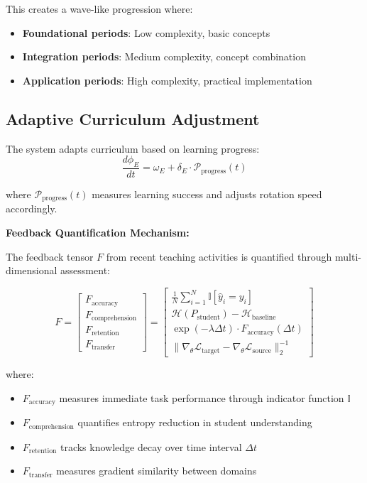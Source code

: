This creates a wave-like progression where:
\begin{itemize}
    \item \textbf{Foundational periods}: Low complexity, basic concepts
    \item \textbf{Integration periods}: Medium complexity, concept combination
    \item \textbf{Application periods}: High complexity, practical implementation
\end{itemize}

\subsection{Adaptive Curriculum Adjustment}

The system adapts curriculum based on learning progress:
\begin{equation}
\frac{d\phi_E}{dt} = \omega_E + \delta_E \cdot \mathcal{P}_{\text{progress}}(t)
\end{equation}

where $\mathcal{P}_{\text{progress}}(t)$ measures learning success and adjusts rotation speed accordingly.

\textbf{Feedback Quantification Mechanism:}

The feedback tensor $F$ from recent teaching activities is quantified through multi-dimensional assessment:

\begin{equation}
F = \begin{bmatrix}
F_{\text{accuracy}} \\
F_{\text{comprehension}} \\
F_{\text{retention}} \\
F_{\text{transfer}}
\end{bmatrix} = \begin{bmatrix}
\frac{1}{N} \sum_{i=1}^N \mathbb{I}[\hat{y}_i = y_i] \\
\mathcal{H}(P_{\text{student}}) - \mathcal{H}_{\text{baseline}} \\
\exp(-\lambda \Delta t) \cdot F_{\text{accuracy}}(\Delta t) \\
\|\nabla_{\theta} \mathcal{L}_{\text{target}} - \nabla_{\theta} \mathcal{L}_{\text{source}}\|_2^{-1}
\end{bmatrix}
\end{equation}

where:
\begin{itemize}
    \item $F_{\text{accuracy}}$ measures immediate task performance through indicator function $\mathbb{I}$
    \item $F_{\text{comprehension}}$ quantifies entropy reduction in student understanding
    \item $F_{\text{retention}}$ tracks knowledge decay over time interval $\Delta t$
    \item $F_{\text{transfer}}$ measures gradient similarity between domains
\end{itemize}

